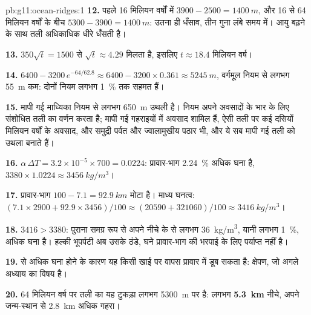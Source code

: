 \begin{solution}{pb:g11:ocean-ridges:1}
\textbf{12.} पहले 16 मिलियन वर्षों में $3900 - 2500 = \qty{1400}{m}$,
और 16 से 64 मिलियन वर्षों के बीच $5300 - 3900 = \qty{1400}{m}$: उतना ही
धँसाव, तीन गुना लंबे समय में। आयु बढ़ने के साथ तली अधिकाधिक धीरे
धँसती है।

\textbf{13.} $350\sqrt{t} = 1500$ से $\sqrt{t} \approx 4.29$ मिलता है, इसलिए
$t \approx 18.4$ मिलियन वर्ष।

\textbf{14.} $6400 - 3200\,e^{-64/62.8} \approx 6400 - 3200 \times 0.361
\approx \qty{5245}{m}$, वर्गमूल नियम से लगभग \qty{55}{m} कम: दोनों
नियम लगभग \qty{1}{\percent} तक सहमत हैं।

\textbf{15.} मापी गई माध्यिका नियम से लगभग \qty{650}{m} उथली है।
नियम अपने अवसादों के भार के लिए संशोधित तली का वर्णन करता है;
मापी गई गहराइयों में अवसाद शामिल हैं, ऐसी तली पर कई दसियों मिलियन वर्षों के
अवसाद, और समुद्री पर्वत और ज्वालामुखीय पठार भी, और ये सब
मापी गई तली को उथला बनाते हैं।

\textbf{16.} $\alpha\,\Delta T = 3.2 \times 10^{-5} \times 700 = 0.0224$:
प्रावार-भाग \qty{2.24}{\percent} अधिक घना है,
$3380 \times 1.0224 \approx \qty{3456}{kg/m^3}$।

\textbf{17.} प्रावार-भाग $100 - 7.1 = \qty{92.9}{km}$ मोटा है। माध्य
घनत्व: $(7.1 \times 2900 + 92.9 \times 3456)/100 \approx (20590 + 321060)/100
\approx \qty{3416}{kg/m^3}$।

\textbf{18.} $3416 > 3380$: पुराना  समग्र रूप से अपने नीचे के  से लगभग
\qty{36}{kg/m^3}, यानी लगभग \qty{1}{\percent}, अधिक घना है।
हल्की भूपर्पटी अब उसके ठंडे, घने प्रावार-भाग की भरपाई के लिए
पर्याप्त नहीं है।

\textbf{19.}  से अधिक घना होने के कारण यह किसी खाई पर वापस
प्रावार में डूब सकता है: क्षेपण, जो अगले अध्याय का विषय है।

\textbf{20.} 64 मिलियन वर्ष पर तली का यह टुकड़ा लगभग
\qty{5300}{m} पर है: लगभग \textbf{5.3~km} नीचे, अपने जन्म-स्थान से
\qty{2.8}{km} अधिक गहरा।
\end{solution}
